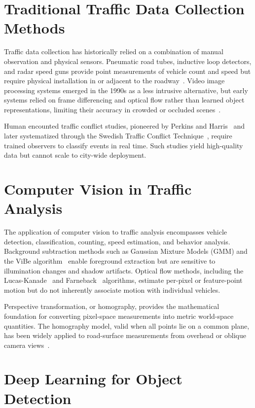 \documentclass[12pt]{report}
\begin{document}
\section{Traditional Traffic Data Collection Methods}

Traffic data collection has historically relied on a combination of manual observation and physical sensors.
Pneumatic road tubes, inductive loop detectors, and radar speed guns provide point measurements of vehicle count and speed but require physical installation in or adjacent to the roadway~\cite{Roess2011}.
Video image processing systems emerged in the 1990s as a less intrusive alternative, but early systems relied on frame differencing and optical flow rather than learned object representations, limiting their accuracy in crowded or occluded scenes~\cite{Coifman1998}.

Human encounted traffic conflict studies, pioneered by Perkins and Harris~\cite{Perkins1968} and later systematized through the Swedish Traffic Conflict Technique~\cite{Hyden1987}, require trained observers to classify events in real time.
Such studies yield high-quality data but cannot scale to city-wide deployment.

\section{Computer Vision in Traffic Analysis}

The application of computer vision to traffic analysis encompasses vehicle detection, classification, counting, speed estimation, and behavior analysis.
Background subtraction methods such as Gaussian Mixture Models (GMM) and the ViBe algorithm~\cite{Barnich2011} enable foreground extraction but are sensitive to illumination changes and shadow artifacts.
Optical flow methods, including the Lucas-Kanade~\cite{Lucas1981} and Farneback~\cite{Farneback2003} algorithms, estimate per-pixel or feature-point motion but do not inherently associate motion with individual vehicles.

Perspective transformation, or homography, provides the mathematical foundation for converting pixel-space measurements into metric world-space quantities.
The homography model, valid when all points lie on a common plane, has been widely applied to road-surface measurements from overhead or oblique camera views~\cite{Dubska2014}.

\section{Deep Learning for Object Detection}
\end{document}
